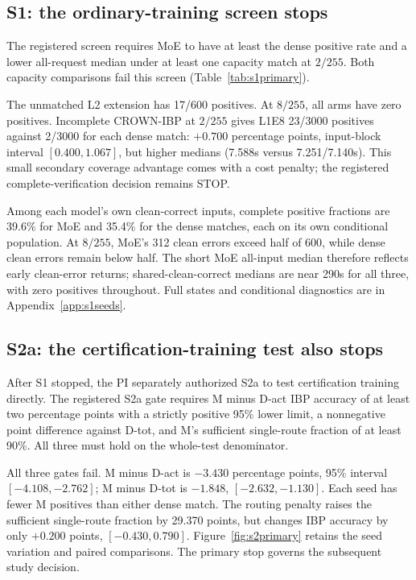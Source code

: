 \documentclass[10pt]{article}
\begin{document}
\subsection{S1: the ordinary-training screen stops}
The registered screen requires MoE to have at least the dense positive rate
and a lower all-request median under at least one capacity match at $2/255$.
Both capacity comparisons fail this screen (Table~\ref{tab:s1primary}).

The unmatched L2 extension has 17/600 positives. At $8/255$, all arms have
zero positives. Incomplete CROWN-IBP at $2/255$ gives L1E8 23/3000 positives
against 2/3000 for each dense match: $+0.700$ percentage points, input-block
interval $[0.400,1.067]$, but higher medians (7.588s versus 7.251/7.140s).
This small secondary coverage advantage comes with a cost penalty; the
registered complete-verification decision remains STOP.

Among each model's own clean-correct inputs, complete positive fractions are
39.6\% for MoE and 35.4\% for the dense matches, each on its own conditional
population. At $8/255$, MoE's 312 clean errors exceed half of 600, while dense
clean errors remain below half. The short MoE all-input median therefore
reflects early clean-error returns; shared-clean-correct medians are near
290s for all three, with zero positives throughout.
Full states and conditional diagnostics are in Appendix~\ref{app:s1seeds}.

\subsection{S2a: the certification-training test also stops}
\label{sec:s2primary}
After S1 stopped, the PI separately authorized S2a to test certification
training directly. The registered S2a gate requires M minus D-act IBP accuracy
of at least two percentage points with a strictly positive 95\% lower limit,
a nonnegative point difference against D-tot, and M's sufficient single-route
fraction of at least 90\%. All three must hold on the whole-test denominator.

All three gates fail. M minus D-act is $-3.430$ percentage points,
95\% interval $[-4.108,-2.762]$; M minus D-tot is $-1.848$,
$[-2.632,-1.130]$. Each seed has fewer M positives than either dense match.
The routing penalty raises the sufficient single-route fraction by 29.370
points, but changes IBP accuracy by only $+0.200$ points,
$[-0.430,0.790]$. Figure~\ref{fig:s2primary} retains the seed variation and
paired comparisons. The primary stop governs the subsequent study decision.
\end{document}
